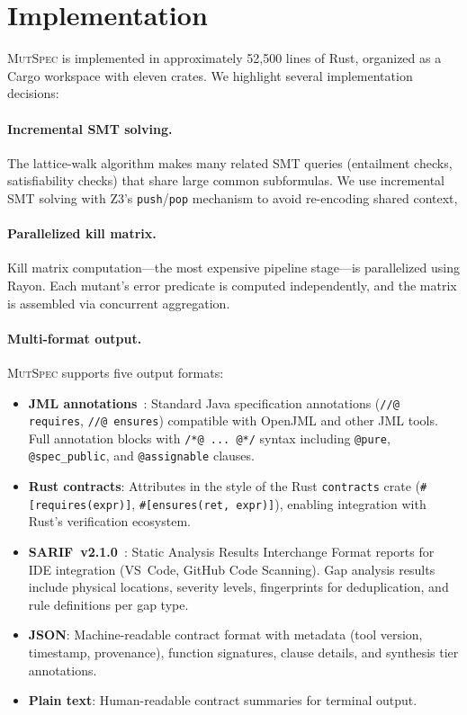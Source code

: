 \documentclass[11pt]{article}
\begin{document}
\section{Implementation}
\label{sec:implementation}

\textsc{MutSpec} is implemented in approximately 52,500 lines of Rust, organized
as a Cargo workspace with eleven crates. We highlight several implementation
decisions:

\paragraph{Incremental SMT solving.} The lattice-walk algorithm makes many
related SMT queries (entailment checks, satisfiability checks) that share large
common subformulas. We use incremental SMT solving with Z3's
\texttt{push}/\texttt{pop} mechanism to avoid re-encoding shared context,

\paragraph{Parallelized kill matrix.} Kill matrix computation---the most
expensive pipeline stage---is parallelized using Rayon. Each mutant's error
predicate is computed independently, and the matrix is assembled via concurrent
aggregation.

\paragraph{Multi-format output.} \textsc{MutSpec} supports five output formats:

\begin{itemize}[leftmargin=*]
  \item \textbf{JML annotations}~\cite{leavens2006}: Standard Java specification
    annotations (\texttt{//@ requires}, \texttt{//@ ensures}) compatible with
    OpenJML and other JML tools. Full annotation blocks with \texttt{/*@ ... @*/}
    syntax including \texttt{@pure}, \texttt{@spec\_public}, and
    \texttt{@assignable} clauses.

  \item \textbf{Rust contracts}: Attributes in the style of the Rust
    \texttt{contracts} crate (\texttt{\#[requires(expr)]},
    \texttt{\#[ensures(ret, expr)]}), enabling integration with Rust's
    verification ecosystem.

  \item \textbf{SARIF~v2.1.0}~\cite{oasis2020sarif}: Static Analysis Results
    Interchange Format reports for IDE integration (VS~Code, GitHub Code
    Scanning). Gap analysis results include physical locations, severity levels,
    fingerprints for deduplication, and rule definitions per gap type.

  \item \textbf{JSON}: Machine-readable contract format with metadata (tool
    version, timestamp, provenance), function signatures, clause details, and
    synthesis tier annotations.

  \item \textbf{Plain text}: Human-readable contract summaries for terminal
    output.
\end{itemize}
\end{document}
